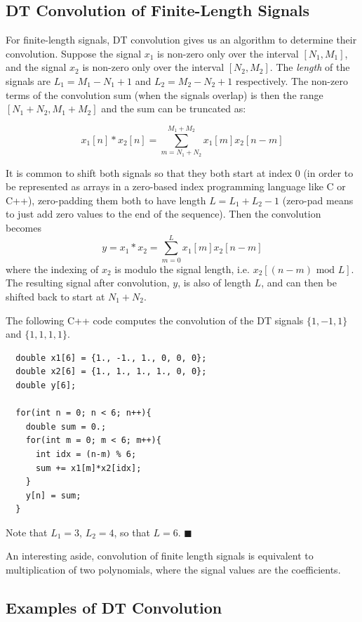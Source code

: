 \subsection{DT Convolution of Finite-Length Signals}

For finite-length signals, DT convolution gives us an algorithm to determine their convolution. Suppose the signal $x_1$ is non-zero only over the interval $[N_1,M_1]$, and the signal $x_2$ is non-zero only over the interval $[N_2,M_2]$. The \emph{length} of the signals are $L_1 = M_1-N_1+1$ and $L_2 = M_2-N_2+1$ respectively. The non-zero terms of the convolution sum (when the signals overlap) is then the range $[N_1+N_2,M_1+M_2]$ and the sum can be truncated as:

\[
x_1[n] * x_2[n] = \sum\limits_{m = N_1+N_2}^{M_1+M_2} x_1[m]x_2[n-m]
\]

It is common to shift both signals so that they both start at index $0$ (in order to be represented as arrays in a zero-based index programming language like C or C++), zero-padding them both to have length $L=L_1+L_2-1$ (zero-pad means to just add zero values to the end of the sequence). Then the convolution becomes
\[
y = x_1 * x_2 = \sum\limits_{m = 0}^{L} x_1[m]x_2[n-m]
\]
where the indexing of $x_2$ is modulo the signal length, i.e. $x_2[(n-m) \mbox{ mod } L]$. The resulting signal after convolution, $y$, is also of length $L$, and can then be shifted back to start at $N_1+N_2$.

\begin{example} The following C++ code computes the convolution of the DT signals $\{1,-1,1\}$ and $\{1,1,1,1\}$.
\begin{verbatim}
  double x1[6] = {1., -1., 1., 0, 0, 0};
  double x2[6] = {1., 1., 1., 1., 0, 0};
  double y[6];

  for(int n = 0; n < 6; n++){
    double sum = 0.;
    for(int m = 0; m < 6; m++){
      int idx = (n-m) % 6;
      sum += x1[m]*x2[idx];
    }
    y[n] = sum;
  }
\end{verbatim}
Note that $L_1 = 3$, $L_2 = 4$, so that $L=6$.
$\blacksquare$
\end{example}

An interesting aside, convolution of finite length signals is equivalent to multiplication of two polynomials, where the signal values are the coefficients.

\subsection{Examples of DT Convolution}

